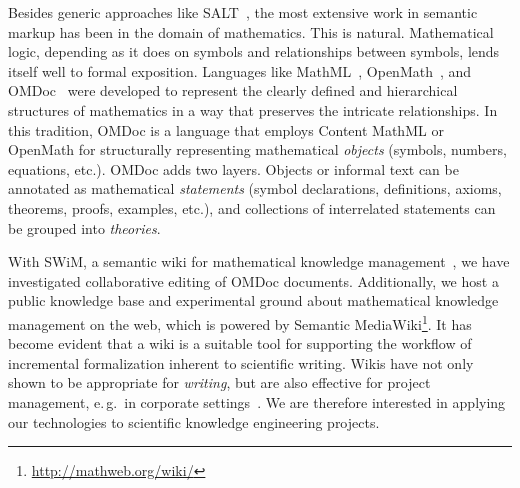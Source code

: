 Besides generic approaches like SALT~\cite{Groza:SALT07}, the most
extensive work in semantic markup has been in the domain of
mathematics.  This is natural.  Mathematical logic, depending
as it does on symbols and relationships between symbols, lends itself
well to formal exposition.
Languages like MathML~\cite{CarlisleEd:MathML07},
OpenMath~\cite{BusCapCar:2oms04}, and OMDoc~\cite{Kohlhase:omdoc1.2}
were developed to represent the clearly defined and hierarchical
structures of mathematics in a way that preserves the intricate
relationships.  In this tradition, OMDoc is a language that employs
Content MathML or OpenMath for structurally representing mathematical
\emph{objects} (symbols, numbers, equations, etc.).  OMDoc adds two
layers.  Objects or informal text can be annotated as mathematical
\emph{statements} (symbol declarations, definitions, axioms, theorems,
proofs, examples, etc.), and collections of interrelated statements
can be grouped into \emph{theories}.

With SWiM, a semantic wiki for mathematical knowledge
management~\cite{Lange:swmkm-tr07}, we have investigated collaborative editing of
OMDoc documents.  Additionally, we host a public knowledge base and experimental
ground about mathematical knowledge management on the web, which is powered by
Semantic MediaWiki\footnote{\url{http://mathweb.org/wiki/}}.  It has become
evident that a wiki is a suitable tool for supporting the workflow of
incremental formalization inherent to scientific writing.  Wikis have not only
shown to be appropriate for \emph{writing}, but are also effective for project
management, e.\,g.\ in corporate settings~\cite{leuf01:wikiway,wikinomics}.  We
are therefore interested in applying our technologies to scientific knowledge
engineering projects.

